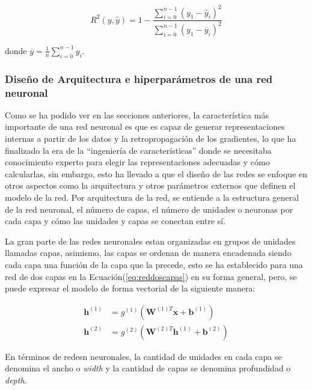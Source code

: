         \begin{equation}\label{eq:r2}
            R^2(y,\hat{y}) = 1 - \frac{\displaystyle\sum_{i=0}^{n-1} (y_1 - \hat{y}_i)^2}{\displaystyle\sum_{i=0}^{n-1} (y_1 - \overline{y}_i)^2}
        \end{equation}

        donde $\overline{y} = \frac{1}{n} \displaystyle\sum_{i=0}^{n-1} y_i$.

        \subsubsection{Diseño de Arquitectura e hiperparámetros de una red neuronal}
        Como se ha podido ver en las secciones anteriores, la característica más importante de una red neuronal es que es capaz
        de generar representaciones internas a partir de los datos y la retropropagación de los gradientes, lo que ha finalizado la era 
        de la ``ingeniería de características'' donde se necesitaba conocimiento experto para elegir las representaciones adecuadas y cómo calcularlas, sin embargo, esto 
        ha llevado a que el diseño de las redes se enfoque en otros aspectos como la arquitectura y otros parámetros externos 
        que definen el modelo de la red. Por arquitectura de la red, se entiende a la estructura general de la red neuronal, 
        el número de capas, el número de unidades o neuronas por cada capa y cómo las unidades y capas se conectan entre sí.

        La gran parte de las redes neuronales estan organizadas en grupos de unidades llamadas capas, asimismo, las capas se 
        ordenan de manera encadenada siendo cada capa una función de la capa que la precede, esto se ha establecido para una red de 
        dos capas en la Ecuación(\ref{eq:reddoscapas}) en su forma general, pero, se puede expresar el modelo de forma vectorial
        de la siguiente manera:

        \begin{align}
            \mathbf{h}^{(1)} &= g^{(1)} \left( \mathbf{W}^{(1)T}\mathbf{x} + \mathbf{b}^{(1)} \right) \\
            \mathbf{h}^{(2)} &= g^{(2)} \left( \mathbf{W}^{(2)T}\mathbf{h}^{(1)} + \mathbf{b}^{(2)} \right)
        \end{align}

        En términos de redesn neuronales, la cantidad de unidades en cada capa se denomina el ancho o \textit{width} 
        y la cantidad de capas se denomina profundidad o \textit{depth}.

